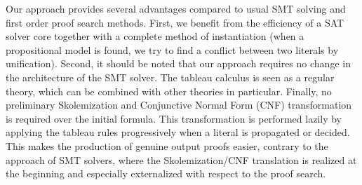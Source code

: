 Our approach provides several advantages compared to usual SMT solving and first
order proof search methods. First, we benefit from the efficiency of a SAT
solver core together with a complete method of instantiation (when a
propositional model is found, we try to find a conflict between two literals by
unification). Second, it should be noted that our approach requires no change in
the architecture of the SMT solver. The tableau calculus is seen as a regular
theory, which can be combined with other theories in particular. Finally, no
preliminary Skolemization and Conjunctive Normal Form (CNF) transformation is
required over the initial formula. This transformation is performed lazily by
applying the tableau rules progressively when a literal is propagated or
decided. This makes the production of genuine output proofs easier, contrary to
the approach of SMT solvers, where the Skolemization/CNF translation is realized
at the beginning and especially externalized with respect to the proof search.
